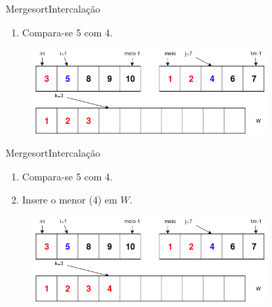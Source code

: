 \documentclass[aspectratio=169]{beamer}
\begin{document}
\begin{frame}{Mergesort}{Intercalação}
\begin{enumerate}
 \item Compara-se 5 com 4.
\end{enumerate}

\begin{figure}[!h]
  \centering
  \includegraphics[width=250pt]{imgs/merge/merge4.png}
  \label{fig_merge4}
\end{figure}
\end{frame}


\begin{frame}{Mergesort}{Intercalação}
\begin{enumerate}
 \item Compara-se 5 com 4.
 \item Insere o menor (4) em $W$.
\end{enumerate}

\begin{figure}[!h]
  \centering
  \includegraphics[width=250pt]{imgs/merge/merge4_1.png}
  \label{fig_merge4_1}
\end{figure}
\end{frame}

\end{document}
